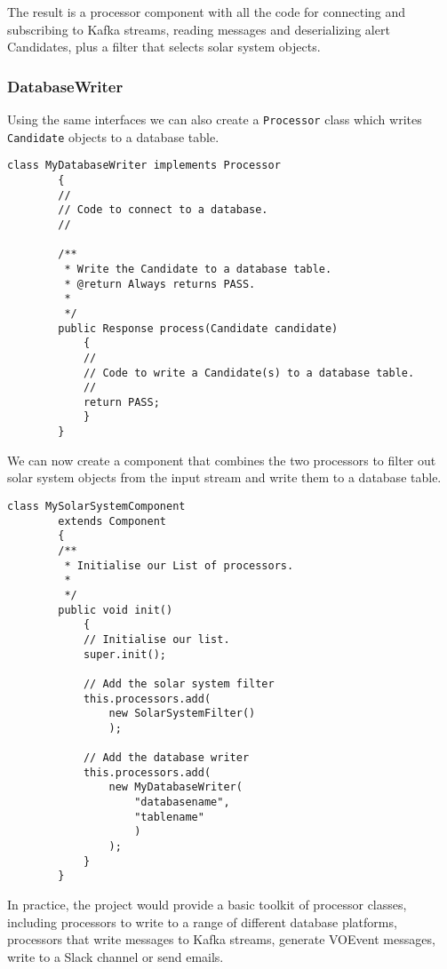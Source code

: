 \documentclass{article}
\newcommand{\voevent} {VOEvent\xspace}
\newcommand{\kafka} {Kafka\xspace}
\begin{document}
The result is a processor component with all the code for connecting and subscribing to \kafka streams, reading messages and deserializing alert Candidates, plus a filter that selects solar system objects.

\subsubsection{DatabaseWriter}
\label{java-interfaces.DatabaseWriter}

Using the same interfaces we can also create a \texttt{Processor} class which writes \texttt{Candidate} objects to a database table.

\begin{lstlisting}[style=Java]
    class MyDatabaseWriter implements Processor
        {
        //
        // Code to connect to a database.
        //

        /**
         * Write the Candidate to a database table.
         * @return Always returns PASS.
         *
         */
        public Response process(Candidate candidate)
            {
            //
            // Code to write a Candidate(s) to a database table.
            //
            return PASS;
            }
        }
\end{lstlisting}

We can now create a component that combines the two processors to filter out solar system objects from the input stream and write them to a database table.

\begin{lstlisting}[style=Java]
    class MySolarSystemComponent
        extends Component
        {
        /**
         * Initialise our List of processors.
         *
         */
        public void init()
            {
            // Initialise our list.
            super.init();

            // Add the solar system filter
            this.processors.add(
                new SolarSystemFilter()
                );

            // Add the database writer
            this.processors.add(
                new MyDatabaseWriter(
                    "databasename",
                    "tablename"
                    )
                );
            }
        }
\end{lstlisting}

In practice, the project would provide a basic toolkit of processor classes, including processors to write to a range of different database platforms, processors that write messages to \kafka streams, generate \voevent messages, write to a Slack channel or send emails.
\end{document}
